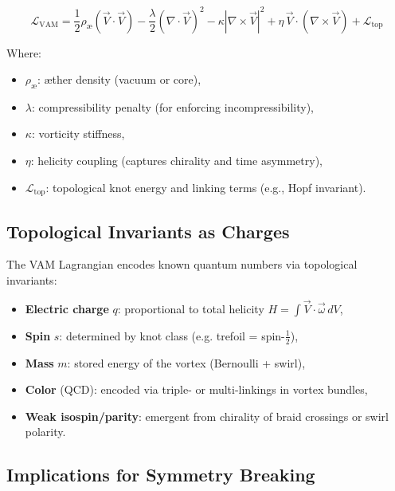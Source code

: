 \begin{equation}
\mathcal{L}_{\text{VAM}} = \frac{1}{2} \rho_\text{\ae} \left( \vec{V} \cdot \vec{V} \right)
- \frac{\lambda}{2} \left( \nabla \cdot \vec{V} \right)^2
- \kappa \left| \nabla \times \vec{V} \right|^2
+ \eta \, \vec{V} \cdot (\nabla \times \vec{V}) + \mathcal{L}_{\text{top}}
\end{equation}

Where:
\begin{itemize}
    \item \( \rho_\text{\ae} \): æther density (vacuum or core),
    \item \( \lambda \): compressibility penalty (for enforcing incompressibility),
    \item \( \kappa \): vorticity stiffness,
    \item \( \eta \): helicity coupling (captures chirality and time asymmetry),
    \item \( \mathcal{L}_{\text{top}} \): topological knot energy and linking terms (e.g., Hopf invariant).
\end{itemize}

\subsection{Topological Invariants as Charges}

The VAM Lagrangian encodes known quantum numbers via topological invariants:

\begin{itemize}
    \item \textbf{Electric charge} \( q \): proportional to total helicity \( H = \int \vec{V} \cdot \vec{\omega} \, dV \),
    \item \textbf{Spin} \( s \): determined by knot class (e.g. trefoil = spin-\( \frac{1}{2} \)),
    \item \textbf{Mass} \( m \): stored energy of the vortex (Bernoulli + swirl),
    \item \textbf{Color} (QCD): encoded via triple- or multi-linkings in vortex bundles,
    \item \textbf{Weak isospin/parity}: emergent from chirality of braid crossings or swirl polarity.
\end{itemize}

\subsection{Implications for Symmetry Breaking}

